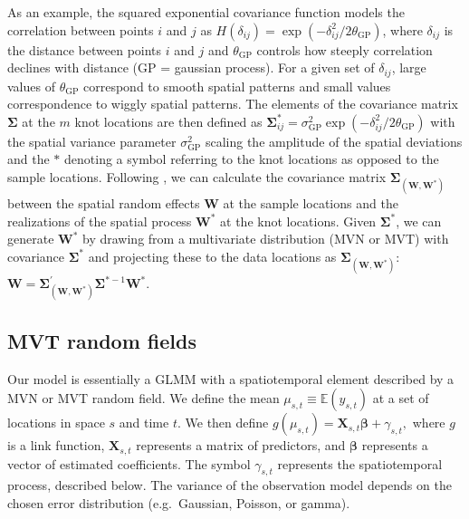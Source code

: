 \documentclass[12pt,english]{article}
\newcommand{\R}[1]{\label{#1}\linelabel{#1}}
\begin{document}
\begin{spacing}{1.8}
As an example, the squared exponential covariance function models the
correlation between points $i$ and $j$ as $H(\delta_{ij}) = \exp
\left(- \delta_{ij}^2 / 2 \theta_{\mathrm{GP}} \right)$, where $\delta_{ij}$ is the
distance between points $i$ and $j$ and $\theta_{\mathrm{GP}}$ controls how steeply correlation
declines with distance (GP = gaussian process). For a given set of $\delta_{ij}$, large values of $\theta_{\mathrm{GP}}$
correspond to smooth spatial patterns and small values correspondence to wiggly
spatial patterns.
The elements of the covariance matrix $\mathbf{\Sigma}$ at the $m$ knot locations are
then defined as $\mathbf{\Sigma}_{ij}^* = \sigma_{\mathrm{GP}}^2 \exp \left( -\delta_{ij}^2 / 2 \theta_{\mathrm{GP}}
\right)$ with the spatial variance parameter $\sigma_{\mathrm{GP}}^2$ scaling the amplitude of the spatial
deviations and the $*$ denoting a symbol referring to the knot locations as opposed to
the sample locations.
Following \citet{latimer2009}, we can calculate the covariance matrix
$\mathbf{\Sigma}_{\left(\mathbf{W}, \mathbf{W^*} \right)}$
between the spatial random effects $\mathbf{W}$ at the sample locations \R{B12}
and the realizations of the spatial process $\mathbf{W^*}$ at the knot locations.
Given
$\mathbf{\Sigma^*}$, we can generate $\mathbf{W^*}$ by drawing
from a multivariate distribution (MVN or MVT) with covariance $\mathbf{\Sigma^*}$ and
projecting these to the data locations as $\mathbf{\Sigma}_{\left( \mathbf{W},\mathbf{W^{*}} \right)}$:
$\mathbf{W}=\mathbf{\Sigma}_{\left(\mathbf{W},\mathbf{W^*} \right)}^{'} \mathbf{\Sigma}^{*-1}\mathbf{W^*}$.



\subsection{MVT random fields}

Our model is essentially a GLMM with a spatiotemporal element described by a MVN
or MVT random field. We define the mean $\mu_{s,t} \equiv \mathbb{E}(y_{s,t})$
at a set of locations
in space $s$ and time $t$.\R{B13} We then define $g(\mu_{s,t}) = \mathbf{X}_{s,t} \bm{\beta} +
\gamma_{s,t},$ where $g$ is a link function, $\mathbf{X}_{s,t}$ represents a matrix of
predictors, and $\bm{\beta}$ represents a vector of estimated coefficients. The symbol
$\gamma_{s,t}$ represents the spatiotemporal process, described below.
The variance of the observation model depends on the
chosen error distribution (e.g.\ Gaussian, Poisson, or gamma).\R{B14}


\end{spacing}
\end{document}
